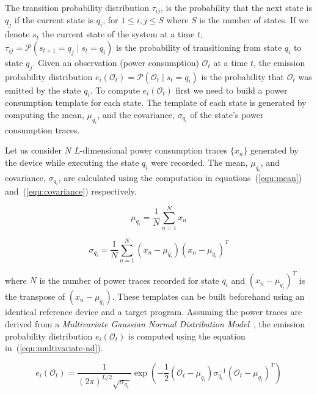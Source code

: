 \documentclass[lnicst]{svmultln}
\begin{document}
The transition probability distribution $\tau_{ij}$, is the probability that the next state is $q_{j}$ if the current state is $q_{i}$, for $1 \leq i,j \leq S$ where $S$ is the number of states. If we denote $s_{t}$ the current state of the system at a time $t$, $\tau_{ij} = \mathcal{P}(s_{t+1}=q_{j}\mid s_{t}=q_{i})$ is the probability of transitioning from state $q_{i}$ to state $q_{j}$. Given an observation (power consumption) $\mathcal{O}_{t}$ at a time $t$, the emission probability distribution $e_{i}(\mathcal{O}_{t})=\mathcal{P}(\mathcal{O}_{t} \mid s_{t}=q_{i})$ is the probability that $\mathcal{O}_{t}$ was emitted by the state $q_{i}$. To compute $e_{i}(\mathcal{O}_{t})$ first we need to build a power consumption template for each state. The template of each state is generated by computing the mean, $\mu_{q_{i}}$, and the covariance, $\sigma_{q_{i}}$ of the state's power consumption traces.

Let us consider $N$ $L$-dimensional power consumption traces $\{x_{n}\}$ generated by the device while executing the state $q_{i}$ were recorded. The mean, $\mu_{q_{i}}$, and covariance, $\sigma_{q_{i}}$, are calculated using the computation in equations~(\ref{equ:mean}) and~(\ref{equ:covariance}) respectively.

\begin{equation}
\mu_{q_{i}} = \frac{1}{N} \sum\limits_{n=1}^N x_{n}
\label{equ:mean}
\end{equation} 

\begin{equation}
\sigma_{q_{i}} = \frac{1}{N} \sum\limits_{n=1}^N (x_{n} - \mu_{q_{i}})(x_{n} - \mu_{q_{i}})^{T}
\label{equ:covariance}
\end{equation}

where $N$ is the number of power traces recorded for state $q_{i}$ and $(x_{n} - \mu_{q_{i}})^{T}$ is the transpose of $(x_{n} - \mu_{q_{i}})$. These templates can be built beforehand using an identical reference device and a target program. Assuming the power traces are derived from a \emph{Multivariate Gaussian Normal Distribution Model}~\cite{ICP-09-AG}, the emission probability distribution $e_{i}(\mathcal{O}_{t})$ is computed using the equation in~(\ref{equ:multivariate-nd}).

\begin{equation}
e_{i}(\mathcal{O}_{t}) = \frac{1}{(2\pi)^{L/2}\sqrt{\sigma_{q_{i}}}} \exp (-\frac{1}{2}(\mathcal{O}_{t}-\mu_{q_{i}})\sigma_{q_{i}}^{-1}(\mathcal{O}_{t}-\mu_{q_{i}})^T)
\label{equ:multivariate-nd}
\end{equation}
\end{document}
